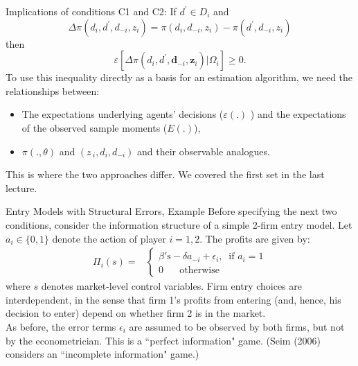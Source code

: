 \documentclass[aspectratio=169,11pt]{beamer}
\begin{document}
\begin{frame}{Implications of conditions C1 and C2:}
If $d^{\prime }\in D_{i}$ and 
\begin{equation*}
\Delta \pi (d_{i},d^{\prime },d_{-i},z_{i})=\pi (d_{i},d_{-i},z_{i})-\pi
(d^{\prime },d_{-i},z_{i})
\end{equation*}
then%
\begin{equation*}
\mathit{\varepsilon }\left[ \Delta \pi (d_{i},d^{\prime },\symbf{d}_{-i},%
\symbf{z}_{i})| \Omega_i \right] \geq 0.
\end{equation*}
To use this inequality directly as a basis for an estimation algorithm, we need the
relationships between:
\begin{itemize}
\item The expectations underlying agents' decisions ($\mathit{\varepsilon }(.)$%
) and the expectations of the observed sample moments ($E(.)$),
\item $\pi (.,\theta )$ and $(z\,_{i},d_{i},d_{-i})$ and their observable
analogues.
\end{itemize}
\vspace{0.2cm}
This is where the two approaches differ.  We covered the first set in the last lecture.
\end{frame}


\begin{frame}{Entry Models with Structural Errors, Example}
\small
Before specifying the next two conditions, consider the information structure of a simple 2-firm entry model. Let $a_i \in \{0,1 \}$ denote the action of player $i = 1,2$. The profits are given by:
\begin{equation*}
\begin{split}
\Pi_i (s) =& \left \{
\begin{array}{l} 
\beta' \text{s} - \delta a_{-i} + \epsilon_i , \;\; \text{if } a_i = 1 \\
0 \;\; \;\; \;\; \text{otherwise}
\end{array}
\right. 
\end{split}
\end{equation*}
where $s$ denotes market-level control variables. 
\vfill
Firm entry choices are interdependent, in the sense that firm 1's profits from entering (and, hence, his decision to enter) depend on whether firm 2 is in the market. \\
\vfill
As before, the error terms $\epsilon_i$ are assumed to be observed by both firms, but not by the econometrician. This is a ``perfect information" game. 
(Seim (2006) considers an ``incomplete information" game.)
\end{frame}
\end{document}
